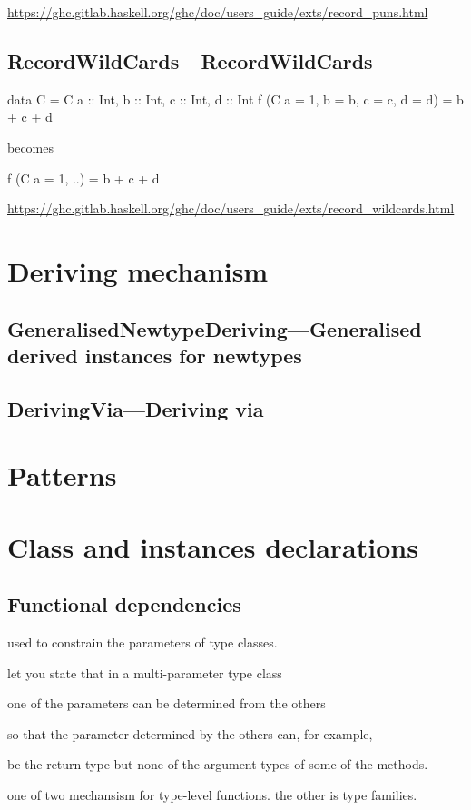 \documentclass[openany, 12pt]{book}
\begin{document}
\begin{haskell}{}
\url{https://ghc.gitlab.haskell.org/ghc/doc/users_guide/exts/record_puns.html}

\chapter{RecordWildCards---RecordWildCards}
\begin{haskell}{}
data C = C {a :: Int, b :: Int, c :: Int, d :: Int}
f (C {a = 1, b = b, c = c, d = d}) = b + c + d
\end{haskell}
becomes

\begin{haskell}{}
f (C {a = 1, ..}) = b + c + d
\end{haskell}
\url{https://ghc.gitlab.haskell.org/ghc/doc/users_guide/exts/record_wildcards.html}


\part{Deriving mechanism}
\setcounter{chapter}{4}
\chapter{GeneralisedNewtypeDeriving---Generalised derived instances for newtypes}

\setcounter{chapter}{7}
\chapter{DerivingVia---Deriving via}

\part{Patterns}
\part{Class and instances declarations}

\setcounter{chapter}{6}
\chapter{Functional dependencies}
\begin{alist}
	\item used to constrain the parameters of type classes.
	\item let you state that in a multi-parameter type class
	\item one of the parameters can be determined from the others
	\item so that the parameter determined by the others can, for example,
	\item be the return type but none of the argument types of some of the methods.
	\item one of two mechansism for type-level functions. the other is type
	families.
\end{alist}


\end{haskell}
\end{document}
